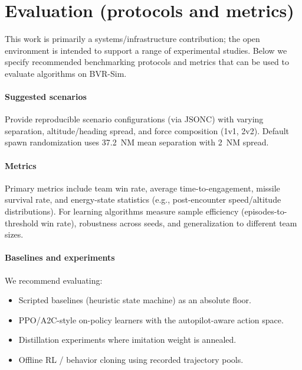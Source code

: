 \documentclass[11pt]{article}
\begin{document}
\section{Evaluation (protocols and metrics)}
This work is primarily a systems/infrastructure contribution; the open environment is intended to support a range of experimental studies. Below we specify recommended benchmarking protocols and metrics that can be used to evaluate algorithms on BVR-Sim.

\paragraph{Suggested scenarios} Provide reproducible scenario configurations (via JSONC) with varying separation, altitude/heading spread, and force composition (1v1, 2v2). Default spawn randomization uses \SI{37.2}{NM} mean separation with \SI{2}{NM} spread.

\paragraph{Metrics} Primary metrics include team win rate, average time-to-engagement, missile survival rate, and energy-state statistics (e.g., post-encounter speed/altitude distributions). For learning algorithms measure sample efficiency (episodes-to-threshold win rate), robustness across seeds, and generalization to different team sizes.

\paragraph{Baselines and experiments} We recommend evaluating:
\begin{itemize}[noitemsep]
  \item Scripted baselines (heuristic state machine) as an absolute floor.
  \item PPO/A2C-style on-policy learners with the autopilot-aware action space.
  \item Distillation experiments where imitation weight is annealed.
  \item Offline RL / behavior cloning using recorded trajectory pools.
\end{itemize}

\end{document}
